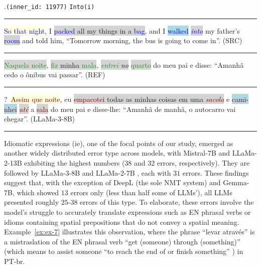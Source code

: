 \ex.\texttt{(inner\_id: 11977)} \hfill \texttt{Into(i)}\\[0.3ex]
\noindent\rule{\linewidth}{0.9pt}
\colorbox{lightyellow}{\textcolor{blue}{So that night}}, I \colorbox{lightgray}{\textcolor{blue}{packed} all my things in a \textcolor{blue}{bag}}, and I \colorbox{lightblue}{\textcolor{blue}{walked}} \colorbox{lightgray}{\emph{\textcolor{blue}{into}}} my father's \colorbox{lightgray}{\textcolor{blue}{room}} and told him, ``Tomorrow morning, the bus is going to come in''. (SRC) \label{ex:ex-6} \\[-0.3ex]
\noindent\rule{\linewidth}{0.3pt}
\colorbox{lightgray}{\textcolor{ForestGreen}{Naquela noite}}, \colorbox{lightgray}{\textcolor{ForestGreen}{fiz} minha \textcolor{ForestGreen}{mala}}, \colorbox{lightgray}{\emph{\textcolor{ForestGreen}{entrei} no}} \colorbox{lightgray}{\textcolor{ForestGreen}{quarto}} do meu pai e disse: ``Amanhã cedo o ônibus vai passar''. (REF) \\[-0.3ex]
\noindent\rule{\linewidth}{0.3pt}
?~\colorbox{lightyellow}{\textcolor{Maroon}{Assim que noite}}, eu \colorbox{lightgray}{\textcolor{Maroon}{empacotei} todas as minhas coisas em uma \emph{\textcolor{Maroon}{sacola}}} e \colorbox{lightblue}{\textcolor{Maroon}{cami-}}\\\colorbox{lightblue}{\textcolor{Maroon}{nhei}}  \colorbox{lightgray}{\emph{\textcolor{Maroon}{até}}} a \colorbox{lightgray}{\textcolor{Maroon}{sala}} do meu pai e disse-lhe: ``Amanhã de manhã, o autocarro vai chegar''. (LLaMa-3-8B) \\[-0.3ex] 
\noindent\rule{\linewidth}{0.9pt}


Idiomatic expressions (ie), one of the focal points of our study, emerged as another widely distributed error type across models, with Mistral-7B and LLaMa-2-13B exhibiting the highest numbers ($38$ and $32$ errors, respectively). They are followed by LLaMa-3-8B and LLaMa-2-7B , each with $31$ errors. These findings suggest that, with the exception of DeepL (the sole NMT system) and Gemma-7B, which showed $13$ errors only (less than half some of LLMs'), all LLMs presented roughly $25$-$38$ errors of this type. To elaborate, these errors involve the model's struggle to accurately translate expressions such as EN phrasal verbs or idioms containing spatial prepositions that do not convey a spatial meaning. Example~\ref{ex:ex-7} illustrates this observation, where the phrase ``levar através'' is a mistraslation of the EN phrasal verb ``get (someone) through (something)'' (which means to assist someone ``to reach the end of or finish something'' \parencite{cambridge2024}) in PT-br.


